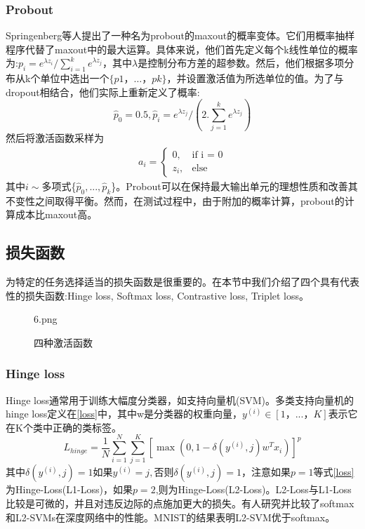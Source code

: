\documentclass[final]{cvpr}
\begin{document}
\subsubsection{Probout}
Springenberg等人提出了一种名为probout的maxout的概率变体。它们用概率抽样程序代替了maxout中的最大运算。具体来说，他们首先定义每个k线性单位的概率为:$p_i=e^{\lambda z_i}/\sum^k_{i=1}e^{\lambda z_j}$，其中$\lambda$是控制分布方差的超参数。然后，他们根据多项分布从k个单位中选出一个$\{p1，…， pk\}$，并设置激活值为所选单位的值。为了与dropout相结合，他们实际上重新定义了概率:
\begin{equation}
	\hat{p}_0=0.5,\hat{p}_i=e^{\lambda z_j}/(2.\sum^k_{j=1}e^{\lambda z_j})
\end{equation}
然后将激活函数采样为
\begin{eqnarray}a_i=
\begin{cases}
	0,&\text{if i = 0} \\
	z_i,&\text{else}
\end{cases}
\end{eqnarray}
其中$i\sim$多项式\{$\hat{p}_0,...,\hat{p}_k$\}。Probout可以在保持最大输出单元的理想性质和改善其不变性之间取得平衡。然而，在测试过程中，由于附加的概率计算，probout的计算成本比maxout高。
\subsection{损失函数}
为特定的任务选择适当的损失函数是很重要的。在本节中我们介绍了四个具有代表性的损失函数:Hinge loss, Softmax loss, Contrastive loss, Triplet loss。
\begin{figure}[t!]
	\begin{overpic}[width=\columnwidth]{6.png}
	\end{overpic}
	\caption{四种激活函数
	}\label{fig:relu}
\end{figure}
\subsubsection{Hinge loss}
Hinge loss通常用于训练大幅度分类器，如支持向量机(SVM)。多类支持向量机的hinge loss定义在\eqref{loss}中，其中w是分类器的权重向量，$y^{(i)}\in[1，. . .， K]$表示它在K个类中正确的类标签。
\begin{equation}\label{loss}
	L_{hinge}=\frac{1}{N}\sum_{i=1}^N\sum_{j=1}^K[\max(0,1-\delta(y^{(i)},j)w^Tx_i)]^p
\end{equation}
其中$\delta(y^{(i)},j)=1 如果 y^{(i)}=j,否则\delta(y^{(i)},j)=1$，注意如果$p=1$等式\eqref{loss}为Hinge-Loss(L1-Loss)，如果$p=2$,则为Hinge-Loss(L2-Loss)。L2-Loss与L1-Loss比较是可微的，并且对违反边际的点施加更大的损失。有人研究并比较了softmax和L2-SVMs在深度网络中的性能。MNIST的结果表明L2-SVM优于softmax。
\end{document}
